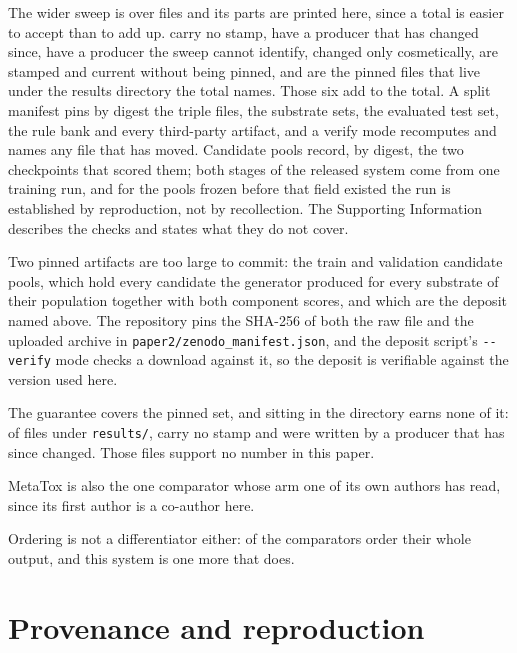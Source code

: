 \documentclass[journal=jcisd8,manuscript=suppinfo,layout=onecolumn]{achemso}
\begin{document}
The wider sweep is over \numProvFiles{} files and its parts are printed here, since a total is
easier to accept than to add up. \numProvUnstamped{} carry no stamp, \numProvChanged{} have a
producer that has changed since, \numProvProducerunknown{} have a producer the sweep cannot
identify, \numProvCosmetic{} changed only cosmetically, \numProvCurrentunpinned{} are stamped and
current without being pinned, and \numProvPinnedinresults{} are the pinned files that live under
the results directory the total names. Those six add to the total. A split manifest pins by
digest the triple files, the substrate sets, the evaluated test set, the rule bank and every
third-party artifact, and a verify mode recomputes and names any file that has moved. Candidate
pools record, by digest, the two checkpoints that scored them; both stages of the released system
come from one training run, and for the pools frozen before that field existed the run is
established by reproduction, not by recollection. The Supporting Information describes the checks
and states
what they do not cover.

Two pinned artifacts are too large to commit: the train and validation candidate pools, which
hold every candidate the generator produced for every substrate of their population together with
both component scores, and which are the deposit named above. The repository pins the
SHA-256 of both the raw file and the uploaded archive in
\texttt{paper2/\allowbreak zenodo\_\allowbreak manifest.json}, and the deposit script's
\texttt{-{}-verify} mode checks a
download against it, so the deposit is verifiable against the version used here.

The guarantee covers the pinned set, and sitting in the directory earns none of it: of
\numProvFiles{} files under
\texttt{results/}, \numProvUnstamped{} carry no stamp and \numProvChanged{} were written by a
producer that has since changed. Those files support no number in this paper.


MetaTox is also the one comparator whose arm one of its own authors has read,
since its first author \citep{Rudik_2017} is a co-author here.

Ordering is not a
differentiator either: \numArmreturnOrderingWord{} of the \numComparatorsNWord{} comparators order
their whole output, and this system is one more that does.
\section{Provenance and reproduction}
\label{sec:si-prov}
\end{document}
